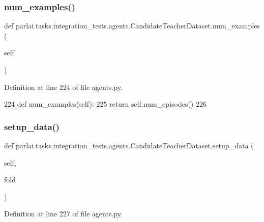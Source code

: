 \subsubsection{\texorpdfstring{num\+\_\+examples()}{num\_examples()}}
{\footnotesize\ttfamily def parlai.\+tasks.\+integration\+\_\+tests.\+agents.\+Candidate\+Teacher\+Dataset.\+num\+\_\+examples (\begin{DoxyParamCaption}\item[{}]{self }\end{DoxyParamCaption})}



Definition at line 224 of file agents.\+py.


\begin{DoxyCode}
224     \textcolor{keyword}{def }num\_examples(self):
225         \textcolor{keywordflow}{return} self.num\_episodes()
226 
\end{DoxyCode}
\mbox{\label{classparlai_1_1tasks_1_1integration__tests_1_1agents_1_1CandidateTeacherDataset_a1ce3b6b6b581baad611c83c31fd84743}} 
\subsubsection{\texorpdfstring{setup\+\_\+data()}{setup\_data()}}
{\footnotesize\ttfamily def parlai.\+tasks.\+integration\+\_\+tests.\+agents.\+Candidate\+Teacher\+Dataset.\+setup\+\_\+data (\begin{DoxyParamCaption}\item[{}]{self,  }\item[{}]{fold }\end{DoxyParamCaption})}



Definition at line 227 of file agents.\+py.


